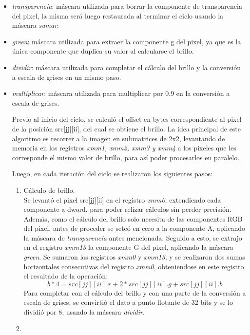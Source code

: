 \documentclass[a4paper]{article}
\begin{document}
\begin{itemize}
	\item \textit{transparencia}: máscara utilizada para borrar la componente de transparencia del pixel, la misma será luego restaurada al terminar el ciclo usando la máscara \textit{sumar}.
	\item \textit{green}: máscara utilizada para extraer la componente g del pixel, ya que es la única componente que duplica su valor al calcularse el brillo.
	\item \textit{dividir}: máscara utilizada para completar el cálculo del brillo y la conversión a escala de grises en un mismo paso.
	\item \textit{multiplicar}: máscara utilizada para multiplicar por 0.9 en la conversión a escala de grises.
	
 Previo al inicio del ciclo, se calculó el offset en bytes correspondiente al pixel de la posición src[jj][ii], del cual se obtiene el brillo. La idea principal de este algoritmo es recorrer a la imagen en submatrices de 2x2, levantando de memoria en los registros \textit{xmm1, xmm2, xmm3 y xmm4} a los pixeles que les corresponde el mismo valor de brillo, para así poder procesarlos en paralelo.
 
 
 Luego, en cada iteración del ciclo se realizaron los siguientes pasos:
 
 \begin{enumerate}
 	\item Cálculo de brillo.\\
 	Se levantó el pixel src[jj][ii] en el registro \textit{xmm0}, extendiendo cada componente a dword, para poder relizar cálculos sin perder precisión. Además, como el cálculo del  brillo solo necesita de las componentes RGB del pixel, antes de proceder se seteó en cero a la componente A, aplicando la máscara de \textit{transparencia} antes mencionada. Seguido a esto, se extrajo en el registro \textit{xmm13} la componente G del pixel, aplicando la máscara \textit{green}. Se sumaron los registros \textit{xmm0} y \textit{xmm13}, y se realizaron dos sumas horizontales consecutivas del registro \textit{xmm0}, obteniendose en este registro el resultado de la operación:
 	\begin{equation}
 	b*4 = src[jj][ii].r + 2 * src[jj][ii].g + src[jj][ii].b 
 	\end{equation}
 	Para completar con el cálculo del brillo y con una parte de la conversión a escala de grises, se convirtió el dato a punto flotante de 32 bits y se lo dividió por 8, usando la máscara \textit{dividir}.
 	
 	\item 
 	
 	
 	
 	
 	    
 \end{enumerate}
 
	
\end{itemize}	 
\end{document}
